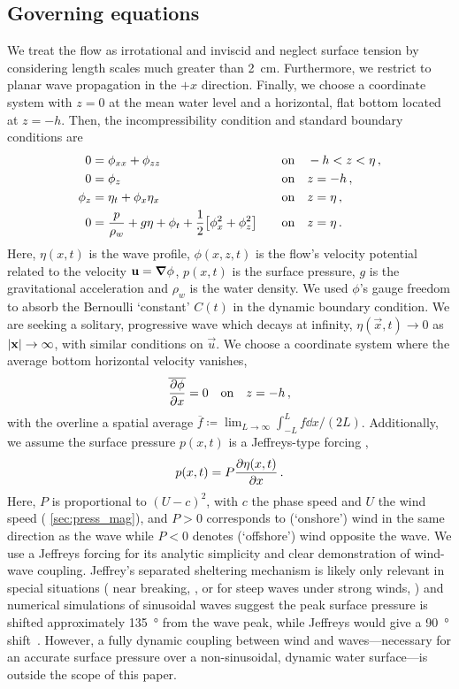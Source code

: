 \documentclass{jfm}
\begin{document}
\subsection{Governing equations}
We treat the flow as irrotational and inviscid and neglect surface
tension by considering length scales much greater than
\SI{2}{\centi\meter}.
Furthermore, we restrict to planar wave propagation in the $+x$
direction.
Finally, we choose a coordinate system with $z=0$ at the mean water
level and a horizontal, flat bottom located at $z=-h$.
Then, the incompressibility condition and standard boundary conditions
are
\begin{alignat}{2}
  0 &= \phi_{xx} + \phi_{zz} &&\qq{on}
  -h < z < \eta \,, \label{eq:laplace}\\
  0 &= \phi_{z} &&\qq{on} z=-h \,, \label{eq:bottom_bc}\\
  \phi_{z} &= \eta_{t} + \phi_{x} \eta_{x} &&\qq{on} z = \eta \,,
  \label{eq:kinematic_bc}\\
  0 &= \frac{p}{\rho_w} + g\eta + \phi_{t} +
  \frac{1}{2} \bqty{\phi_{x}^2 + \phi_{z}^2} &&\qq{on} z=
  \eta \,. \label{eq:dynamic_bc}
\end{alignat}
Here, $\eta(x,t)$ is the wave profile, $\phi(x,z,t)$ is the flow's
velocity potential related to the velocity $\mathbf{\bm{u}} = \grad{\phi}$,
$p(x,t)$ is the surface pressure, $g$ is the gravitational acceleration
and $\rho_w$ is the water density.
We used $\phi$'s gauge freedom to absorb the Bernoulli `constant'
$C(t)$ in the dynamic boundary condition.
We are seeking a solitary, progressive wave which decays at infinity,
$\eta(\vec{x},t) \to 0$ as $\abs{\mathbf{\bm{x}}} \to \infty$, with similar
conditions on $\vec{u}$.
We choose a coordinate system where the average bottom horizontal
velocity vanishes,
\begin{equation}
  \overline{ \pdv{\phi}{x} } = 0 \qq{on} z=-h \,,
  \label{eq:bot_bc_horz}
\end{equation}
with the overline a spatial average $\overline{f} \coloneqq
\lim_{L\to\infty} \int_{-L}^{L} f \dd{x} / (2L)$.
Additionally, we assume the surface pressure $p(x,t)$ is a Jeffreys-type
forcing \citep{jeffreys1925formation},
\begin{equation}
  p(x,t) = P \pdv{\eta(x,t)}{x} \,.
\end{equation}
Here, $P$ is proportional to $(U-c)^2$, with $c$ the phase speed and $U$
the wind speed (\cf{} \cref{sec:press_mag}), and $P>0$ corresponds to
(`onshore') wind in the same direction as the wave while $P<0$ denotes
(`offshore') wind opposite the wave.
We use a Jeffreys forcing for its analytic simplicity and clear
demonstration of wind-wave coupling.
Jeffrey's separated sheltering mechanism is likely only relevant
in special situations (\eg{} near breaking,
\citealp{banner1976separation}, or for steep waves under strong winds,
\citealp{tian2013evolution,touboul2006interaction}) and numerical
simulations of sinusoidal waves suggest the peak surface pressure is
shifted approximately \SI{135}{\degree} from the wave peak, while
Jeffreys would give a \SI{90}{\degree}
shift~\citep{husain2019boundary}.
However, a fully dynamic coupling between wind and waves---necessary for
an accurate surface pressure over a non-sinusoidal, dynamic water
surface---is outside the scope of this paper.
\end{document}
